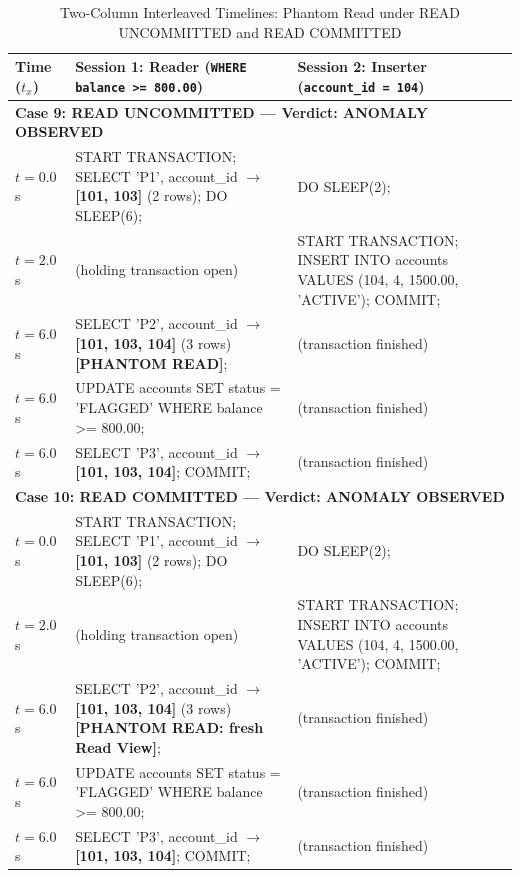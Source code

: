 \documentclass[sigconf, pbalance, nonacm]{acmart}
\begin{document}
\begin{table}[t]
\centering
\small
\caption{Two-Column Interleaved Timelines: Phantom Read under READ UNCOMMITTED and READ COMMITTED}
\label{tab:phantom_ru_rc}
\begin{tabularx}{\textwidth}{p{1.8cm} X X}
\toprule
\textbf{Time ($t_x$)} & \textbf{Session 1: Reader (\texttt{WHERE balance >= 800.00})} & \textbf{Session 2: Inserter (\texttt{account\_id = 104})} \\
\midrule
\multicolumn{3}{l}{\textbf{Case 9: READ UNCOMMITTED --- Verdict: ANOMALY OBSERVED}} \\
$t = 0.0$s & START TRANSACTION; SELECT 'P1', account\_id $\rightarrow$ \textbf{[101, 103]} (2 rows); DO SLEEP(6); & DO SLEEP(2); \\
$t = 2.0$s & (holding transaction open) & START TRANSACTION; INSERT INTO accounts VALUES (104, 4, 1500.00, 'ACTIVE'); COMMIT; \\
$t = 6.0$s & SELECT 'P2', account\_id $\rightarrow$ \textbf{[101, 103, 104]} (3 rows) \textbf{[PHANTOM READ]}; & (transaction finished) \\
$t = 6.0$s & UPDATE accounts SET status = 'FLAGGED' WHERE balance >= 800.00; & (transaction finished) \\
$t = 6.0$s & SELECT 'P3', account\_id $\rightarrow$ \textbf{[101, 103, 104]}; COMMIT; & (transaction finished) \\
\midrule
\multicolumn{3}{l}{\textbf{Case 10: READ COMMITTED --- Verdict: ANOMALY OBSERVED}} \\
$t = 0.0$s & START TRANSACTION; SELECT 'P1', account\_id $\rightarrow$ \textbf{[101, 103]} (2 rows); DO SLEEP(6); & DO SLEEP(2); \\
$t = 2.0$s & (holding transaction open) & START TRANSACTION; INSERT INTO accounts VALUES (104, 4, 1500.00, 'ACTIVE'); COMMIT; \\
$t = 6.0$s & SELECT 'P2', account\_id $\rightarrow$ \textbf{[101, 103, 104]} (3 rows) \textbf{[PHANTOM READ: fresh Read View]}; & (transaction finished) \\
$t = 6.0$s & UPDATE accounts SET status = 'FLAGGED' WHERE balance >= 800.00; & (transaction finished) \\
$t = 6.0$s & SELECT 'P3', account\_id $\rightarrow$ \textbf{[101, 103, 104]}; COMMIT; & (transaction finished) \\
\bottomrule
\end{tabularx}
\end{table}
\end{document}
